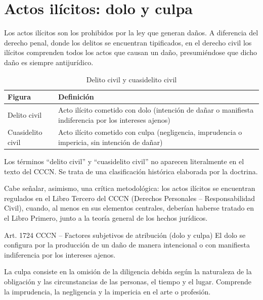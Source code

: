 \documentclass[12pt,oneside]{book}
\begin{document}
\section{Actos ilícitos: dolo y culpa}

Los actos ilícitos son los prohibidos por la ley que generan daños. A diferencia del derecho penal, donde los delitos se encuentran tipificados, en el derecho civil los ilícitos comprenden todos los actos que causan un daño, presumiéndose que dicho daño es siempre antijurídico.

\begin{table}[H]
\centering
\caption{Delito civil y cuasidelito civil}
\begin{tabularx}{\textwidth}{l X}
\toprule
\textbf{Figura} & \textbf{Definición} \\
\midrule
Delito civil & Acto ilícito cometido con dolo (intención de dañar o manifiesta indiferencia por los intereses ajenos) \\
Cuasidelito civil & Acto ilícito cometido con culpa (negligencia, imprudencia o impericia, sin intención de dañar) \\
\bottomrule
\end{tabularx}
\end{table}

\begin{note}
Los términos ``delito civil'' y ``cuasidelito civil'' no aparecen literalmente en el texto del CCCN. Se trata de una clasificación histórica elaborada por la doctrina.

Cabe señalar, asimismo, una crítica metodológica: los actos ilícitos se encuentran regulados en el Libro Tercero del CCCN (Derechos Personales -- Responsabilidad Civil), cuando, al menos en sus elementos centrales, deberían haberse tratado en el Libro Primero, junto a la teoría general de los hechos jurídicos.
\end{note}

\begin{definition}{Art. 1724 CCCN -- Factores subjetivos de atribución (dolo y culpa)}
El dolo se configura por la producción de un daño de manera intencional o con manifiesta indiferencia por los intereses ajenos.

La culpa consiste en la omisión de la diligencia debida según la naturaleza de la obligación y las circunstancias de las personas, el tiempo y el lugar. Comprende la imprudencia, la negligencia y la impericia en el arte o profesión.
\end{definition}
\end{document}

